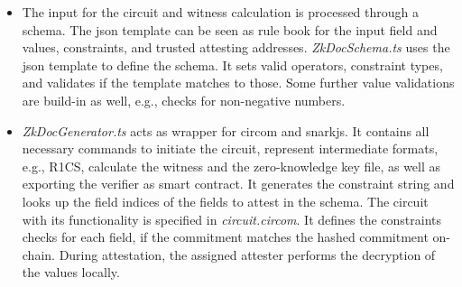 \begin{itemize}

\item The input for the circuit and witness calculation is processed through a schema. The json template can be seen as rule book for the input field and values, constraints, and trusted attesting addresses. \textit{ZkDocSchema.ts} uses the json template to define the schema. It sets valid operators, constraint types, and validates if the template matches to those. Some further value validations are build-in as well, e.g., checks for non-negative numbers. 

\item \textit{ZkDocGenerator.ts} acts as wrapper for circom and snarkjs. It contains all necessary commands to initiate the circuit, represent intermediate formats, e.g., R1CS, calculate the witness and the zero-knowledge key file, as well as exporting the verifier as smart contract. It generates the constraint string and looks up the field indices of the fields to attest in the schema. The circuit with its functionality is specified in \textit{circuit.circom}. It defines the constraints checks for each field, if the commitment matches the hashed commitment on-chain. During attestation, the assigned attester performs the decryption of the values locally.


\end{itemize}
